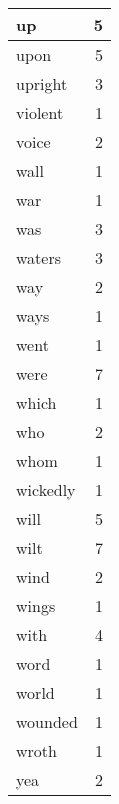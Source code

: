 \begin{center}
\begin{longtable}{l|r}
up & 5 \\ \hline
upon & 5 \\ \hline
upright & 3 \\ \hline
violent & 1 \\ \hline
voice & 2 \\ \hline
wall & 1 \\ \hline
war & 1 \\ \hline
was & 3 \\ \hline
waters & 3 \\ \hline
way & 2 \\ \hline
ways & 1 \\ \hline
went & 1 \\ \hline
were & 7 \\ \hline
which & 1 \\ \hline
who & 2 \\ \hline
whom & 1 \\ \hline
wickedly & 1 \\ \hline
will & 5 \\ \hline
wilt & 7 \\ \hline
wind & 2 \\ \hline
wings & 1 \\ \hline
with & 4 \\ \hline
word & 1 \\ \hline
world & 1 \\ \hline
wounded & 1 \\ \hline
wroth & 1 \\ \hline
yea & 2 \\ \hline
\end{longtable}
\end{center}



\normalsize



